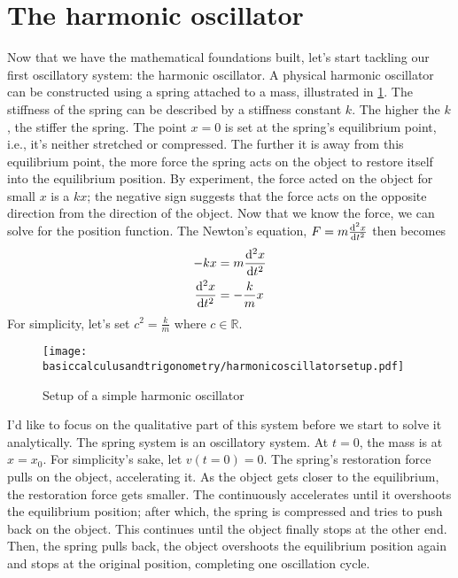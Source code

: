 \section{The harmonic oscillator}

Now that we have the mathematical foundations built, let's start tackling our first oscillatory system: the harmonic oscillator. A physical harmonic oscillator can be constructed using a spring attached to a mass, illustrated in \cref{fig:simple_harmonic_oscillator_setup}. The stiffness of the spring can be described by a stiffness constant $k$. The higher the $k$, the stiffer the spring. The point $x = 0$ is set at the spring's equilibrium point, i.e., it's neither stretched or compressed. The further it is away from this equilibrium point, the more force the spring acts on the object to restore itself into the equilibrium position. By experiment, the force acted on the object for small $x$ is a $kx$; the negative sign suggests that the force acts on the opposite direction from the direction of the object. Now that we know the force, we can solve for the position function. The Newton's equation, $F = m\odv[ord = 2]{x}{t}$ then becomes
\begin{align}
	-kx &= m\odv[ord = 2]{x}{t} \\
	\odv[ord = 2]{x}{t} &= -\frac{k}{m}x \label{eq:simple_harmonic_oscillator_newton}
\end{align}
For simplicity, let's set $c^2 = \frac{k}{m}$ where $c \in \mathbb{R}$.
\begin{figure}[ht]
	\centering
	\texttt{[image: basiccalculusandtrigonometry/harmonicoscillatorsetup.pdf]}
	\caption{Setup of a simple harmonic oscillator}
	\label{fig:simple_harmonic_oscillator_setup}
\end{figure}

I'd like to focus on the qualitative part of this system before we start to solve it analytically. The spring system is an oscillatory system. At $t = 0$, the mass is at $x = x_0$. For simplicity's sake, let $v(t = 0) = 0$. The spring's restoration force pulls on the object, accelerating it. As the object gets closer to the equilibrium, the restoration force gets smaller. The continuously accelerates until it overshoots the equilibrium position; after which, the spring is compressed and tries to push back on the object. This continues until the object finally stops at the other end. Then, the spring pulls back, the object overshoots the equilibrium position again and stops at the original position, completing one oscillation cycle.

